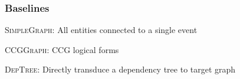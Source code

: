 \documentclass[mathserif,12pt]{beamer}
\newcommand{\hlight}[1]{{\color{blue!80} #1}}
\newcommand \deptree{\textsc{DepTree}\xspace}
\newcommand \simplegraph{\textsc{SimpleGraph}\xspace}
\newcommand \ccggraph{\textsc{CCGGraph}\xspace}
\begin{document}
\begin{frame}
\large
\frametitle{Baselines}
\hlight{\simplegraph: }All entities connected to a single event

\pause

\vspace{0.9cm} 
\hlight{\ccggraph: } CCG logical forms 

\pause
\vspace{0.9cm}
\hlight{\deptree:} Directly transduce a dependency tree to target graph \\

\end{frame}
\end{document}
